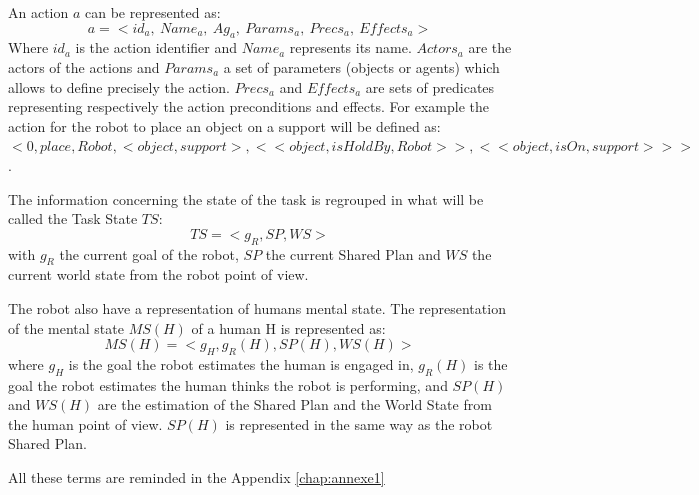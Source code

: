 \documentclass[english,a4paper,11pt,twoside]{StyleThese}
\begin{document}
An action $a$ can be represented as: 
$$a = < id_{a}, \ Name_{a}, \ Ag_{a}, \ Params_{a}, \ Precs_{a}, \ Effects_{a} >$$
Where $id_{a}$ is the action identifier and $Name_{a}$ represents its name. $Actors_{a}$ are the actors of the actions and $Params_{a}$ a set of parameters (objects or agents) which allows to define precisely the action. $Precs_{a}$ and $Effects_{a}$ are sets of predicates representing respectively the action preconditions and effects.
For example the action for the robot to place an object on a support will be defined as:$<0, place, Robot, <object, support>, <<object, isHoldBy, Robot>>, <<object, isOn, support>>>$.

The information concerning the state of the task is regrouped in what will be called the Task State $TS$:
$$TS = <g_R, SP, WS>$$
with $g_R$ the current goal of the robot, $SP$ the current Shared Plan and $WS$ the current world state from the robot point of view.

The robot also have a representation of humans mental state. The representation of the mental state $MS(H)$ of a human H is represented as:
$$MS(H) = <g_H, g_R(H), SP(H), WS(H)>$$
where $g_H$ is the goal the robot estimates the human is engaged in, $g_R(H)$ is the goal the robot estimates the human thinks the robot is performing, and $SP(H)$ and $WS(H)$ are the estimation of the Shared Plan and the World State from the human point of view.
$SP(H)$ is represented in the same way as the robot Shared Plan.

All these terms are reminded in the Appendix \ref{chap:annexe1}


\ifdefined{}
\else


\end{document}
